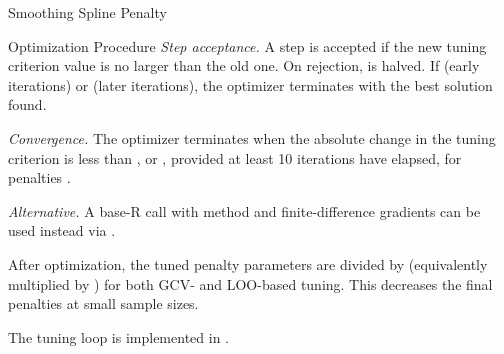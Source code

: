 \begin{Section}{Smoothing Spline Penalty}
\begin{SubSection}{Optimization Procedure}
\emph{Step acceptance.} A step is accepted if the new tuning criterion value
is no larger than the old one.
On rejection, \eqn{\alpha}{} is halved. If  (early
iterations) or  (later iterations), the optimizer
terminates with the best solution found.

\emph{Convergence.} The optimizer terminates when
the absolute change in the tuning criterion is less than \eqn{\epsilon}{}, or
,
provided at least 10 iterations have elapsed, for penalties
.

\emph{Alternative.} A base-R
 call with method  and
finite-difference gradients can be used instead via
.

 After optimization, the
tuned penalty parameters are divided by 
(equivalently multiplied by ) for both GCV- and
LOO-based tuning. This decreases the final penalties at small sample sizes.

The tuning loop is implemented in .
\end{SubSection}

\end{Section}
%
